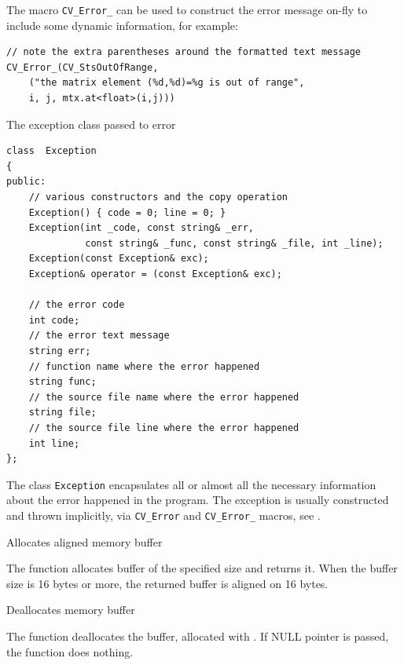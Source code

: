 The macro \texttt{CV\_Error\_} can be used to construct the error message on-fly to include some dynamic information, for example:

\begin{lstlisting}
// note the extra parentheses around the formatted text message
CV_Error_(CV_StsOutOfRange,
    ("the matrix element (%d,%d)=%g is out of range",
    i, j, mtx.at<float>(i,j)))
\end{lstlisting}


\label{Exception}
The exception class passed to error

\begin{lstlisting}
class  Exception
{
public:
    // various constructors and the copy operation
    Exception() { code = 0; line = 0; }
    Exception(int _code, const string& _err,
              const string& _func, const string& _file, int _line);
    Exception(const Exception& exc);
    Exception& operator = (const Exception& exc);

    // the error code
    int code;
    // the error text message
    string err;
    // function name where the error happened
    string func;
    // the source file name where the error happened
    string file;
    // the source file line where the error happened
    int line;
};
\end{lstlisting}

The class \texttt{Exception} encapsulates all or almost all the necessary information about the error happened in the program. The exception is usually constructed and thrown implicitly, via \texttt{CV\_Error} and \texttt{CV\_Error\_} macros, see .


Allocates aligned memory buffer

\begin{description}
\end{description}
 
The function allocates buffer of the specified size and returns it. When the buffer size is 16 bytes or more, the returned buffer is aligned on 16 bytes.

Deallocates memory buffer

\begin{description}
\end{description}

The function deallocates the buffer, allocated with .
If NULL pointer is passed, the function does nothing.

